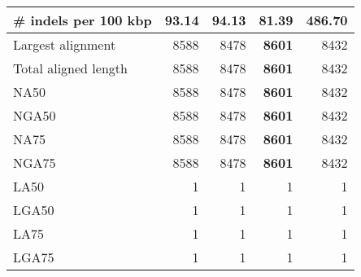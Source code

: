 \documentclass[12pt,a4paper]{article}
\begin{document}
\begin{table}[ht]
\begin{center}
\begin{tabular}{|l*{4}{|r}|}
\# indels per 100 kbp & 93.14 & 94.13 & {\bf 81.39} & 486.70 \\ \hline
Largest alignment & 8588 & 8478 & {\bf 8601} & 8432 \\ \hline
Total aligned length & 8588 & 8478 & {\bf 8601} & 8432 \\ \hline
NA50 & 8588 & 8478 & {\bf 8601} & 8432 \\ \hline
NGA50 & 8588 & 8478 & {\bf 8601} & 8432 \\ \hline
NA75 & 8588 & 8478 & {\bf 8601} & 8432 \\ \hline
NGA75 & 8588 & 8478 & {\bf 8601} & 8432 \\ \hline
LA50 & 1 & 1 & 1 & 1 \\ \hline
LGA50 & 1 & 1 & 1 & 1 \\ \hline
LA75 & 1 & 1 & 1 & 1 \\ \hline
LGA75 & 1 & 1 & 1 & 1 \\ \hline
\end{tabular}
\end{center}
\end{table}
\end{document}
